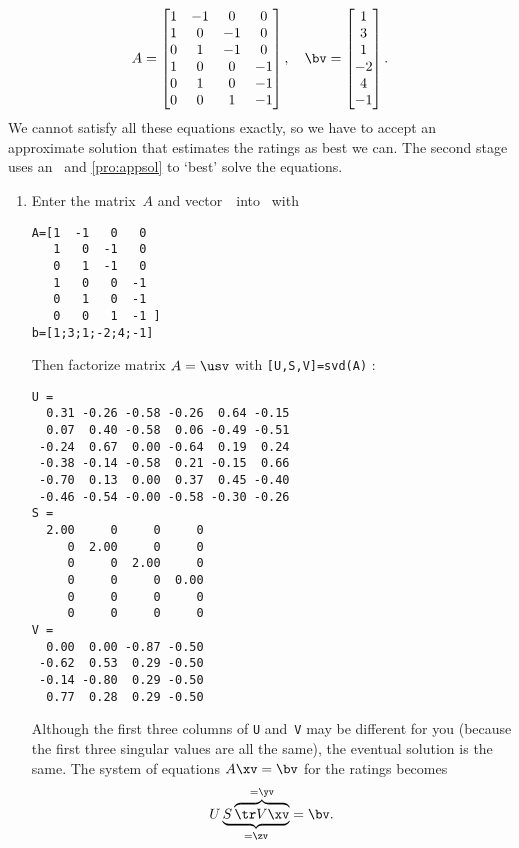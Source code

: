 \begin{example}
\begin{solution}
\begin{equation*}
A=\begin{bmatrix}    1 & -1 & 0 & 0
\\ 1 & 0 & -1 & 0
\\ 0 & 1 & -1 & 0
\\ 1 & 0 & 0 & -1
\\ 0 & 1 & 0 & -1
\\ 0 & 0 & 1 & -1
 \end{bmatrix},\quad
 \bv=\begin{bmatrix} 1\\ 3\\ 1\\ -2\\ 4\\ -1 \end{bmatrix}.
\end{equation*}
We cannot satisfy all these equations exactly, so we have to accept an approximate solution that estimates the ratings as best we can.
The second stage uses an \svd\ and \cref{pro:appsol} to `best' solve the equations.
\begin{enumerate}
\item Enter the matrix~\(A\) and vector~\bv\ into \script\ with
\setbox\ajrqrbox\hbox{}%
\marginajrbox%
\begin{verbatim}
A=[1  -1   0   0
   1   0  -1   0
   0   1  -1   0
   1   0   0  -1
   0   1   0  -1
   0   0   1  -1 ]
b=[1;3;1;-2;4;-1]
\end{verbatim}
Then factorize  matrix \(A=\usv\) with \verb|[U,S,V]=svd(A)| \twodp:
\begin{verbatim}
U =
  0.31 -0.26 -0.58 -0.26  0.64 -0.15
  0.07  0.40 -0.58  0.06 -0.49 -0.51
 -0.24  0.67  0.00 -0.64  0.19  0.24
 -0.38 -0.14 -0.58  0.21 -0.15  0.66
 -0.70  0.13  0.00  0.37  0.45 -0.40
 -0.46 -0.54 -0.00 -0.58 -0.30 -0.26
S =
  2.00     0     0     0
     0  2.00     0     0
     0     0  2.00     0
     0     0     0  0.00
     0     0     0     0
     0     0     0     0
V =
  0.00  0.00 -0.87 -0.50
 -0.62  0.53  0.29 -0.50
 -0.14 -0.80  0.29 -0.50
  0.77  0.28  0.29 -0.50
\end{verbatim}
Although the first three columns of \verb|U| and~\verb|V| may be different for you (because the first three singular values are all the same),  the eventual solution is the same.
The system of equations \(A\xv=\bv\) for the ratings becomes
\begin{equation*}
U\underbrace{S\overbrace{\tr V\xv}^{=\yv}}_{=\zv}
=\bv.
\end{equation*}


\end{enumerate}
\end{solution}
\end{example}

